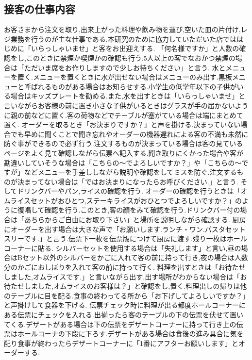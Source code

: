\documentclass[a4paper]{jarticle}
\begin{document}
\subsection{接客の仕事内容}
お客さまから注文を取り,出来上がった料理や飲み物を運び,空いた皿の片付け,レジ業務を行うのが主な仕事である.本研究のために協力していただいた店でははじめに「いらっしゃいませ」と客をお出迎えする.
「何名様ですか」と人数の確認をし,このときに禁煙か喫煙かの確認も行う.5人以上の客でなおかつ禁煙の場合は「ただいま席をお作りしますので少しお待ちください」と言う.
水とメニューを置く.メニューを置くときに水が出せない場合はメニューのみ出す.黒板メニューと呼ばれるものがある場合はお知らせする.小学生の低学年以下の子供がいる場合はキッズプレートを勧める.また,水を出すときは「いらっしゃいませ」と言いながらお客様の前に置き小さな子供がいるときはグラスが手の届かないように親の前などに置く.客の荷物などでテーブルが塞がている場合は端にまとめて置く.
オーダーを取るとき「お決まりですか？」と声を掛ける.決まっていない場合でも早めに聞くことで聞き忘れやオーダーの機器遅れによる客の不満も未然に防ぐ事ができるので必ず行う.注文するものが決まっている場合は客の見ているページをよく見て確認しながら伝票へ記入する.聞き取りにくかった場合や客が勘違いしていそうな場合は「こちらの〜でよろしいですか？」や「こちらの〜ですが」などメニューを手差ししながら説明や確認をしてミスを防ぐ.注文するものが決まってない場合は「ではお決まりになったらお呼びください.」と言う.
そしてドリンクバーやパン,ライスの確認を行う.
オーダーの確認を行うときは「オムライスセットがおひとつ,ステーキライスがおひとつでよろしいですか？」のように復唱して確認を行う.このとき,客の顔をみて確認を行う.ドリンクバー付の場合は「あちらからご自由にお取り下さい」と場所を説明しながら確認する.
厨房にオーダーを出す場合は大きな声で「お願いします.ランチ・ワン.パスタセットスリーです.」と言う.伝票下一枚を伝票版につけて厨房に渡す.残り一枚はホールコーナーに貼る.
シルバーセットを使用する場合は「失礼します」と言い,昼の場合はBセット以外のシルバーをかごに入れて客の前に持って行き,夜の場合は人数分のかごにおしぼりを入れて客の前に持って行く.
料理を出すときは「お待たせしました,オムライスです.」と言いながら出す.出す場所がわからない場合は「お待たせしました,オムライスのお客様は？」と確認をし,置く.料理出しの帰りは他のテーブルに目を配る.食事の終わってる所から「お下げしてよろしいですか？」と声掛けして食器を下げる.
伝票チェック時に料理が出る都度ホールコーナーにある伝票にチェックを入れる.出揃ったら客のテーブルの下の伝票を伏せて置いてくる.デザートがある場合は下の伝票をデザートコーナーに持って行き上の伝票はホールコーナの下段に下ろす.デザートがある場合は食後の進み具合に気を配り食事が終わったらデザートコーナーに「1番にアフターお願いします」とオーダーする.
\end{document}
